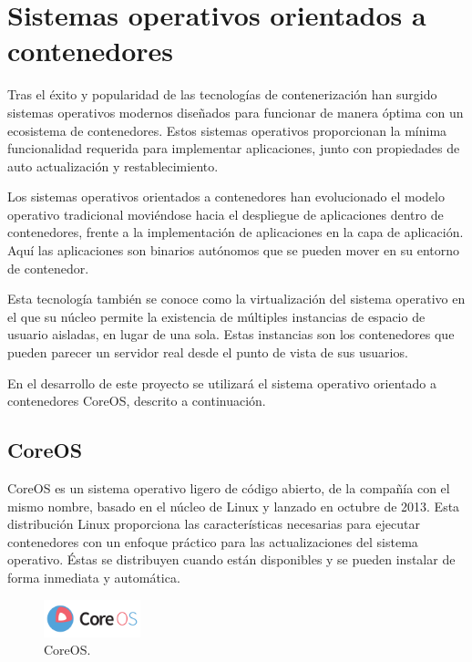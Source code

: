 \section{Sistemas operativos orientados a contenedores}

Tras el éxito y popularidad de las tecnologías de contenerización han surgido sistemas operativos modernos diseñados para funcionar de manera óptima con un ecosistema de contenedores. Estos sistemas operativos proporcionan la mínima funcionalidad requerida para implementar aplicaciones, junto con propiedades de auto actualización y restablecimiento.

Los sistemas operativos orientados a contenedores han evolucionado el modelo operativo tradicional moviéndose hacia el despliegue de aplicaciones dentro de contenedores, frente a la implementación de aplicaciones en la capa de aplicación. Aquí las aplicaciones son binarios autónomos que se pueden mover en su entorno de contenedor.

Esta tecnología también se conoce como la virtualización del sistema operativo en el que su núcleo permite la existencia de múltiples instancias de espacio de usuario aisladas, en lugar de una sola. Estas instancias son los contenedores que pueden parecer un servidor real desde el punto de vista de sus usuarios.

En el desarrollo de este proyecto se utilizará el sistema operativo orientado a contenedores CoreOS, descrito a continuación.

\subsection{CoreOS}

CoreOS es un sistema operativo ligero de código abierto, de la compañía con el mismo nombre, basado en el núcleo de Linux y lanzado en octubre de 2013. Esta distribución Linux proporciona las características necesarias para ejecutar contenedores con un enfoque práctico para las actualizaciones del sistema operativo. Éstas se distribuyen cuando están disponibles y se pueden instalar de forma inmediata y automática.

\begin{figure}[H]
\centering
\includegraphics[width=0.25\textwidth]{images/figures/coreos.png}
\caption{CoreOS.\footnotemark}
\end{figure}

